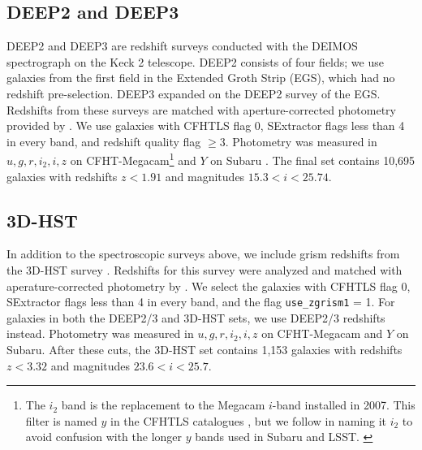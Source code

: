 \subsection{DEEP2 and DEEP3}

DEEP2 and DEEP3 are redshift surveys conducted with the DEIMOS spectrograph on the Keck 2 telescope.
DEEP2 \citep{Newman2013b} consists of four fields; we use galaxies from the first field in the Extended Groth Strip (EGS), which had no redshift pre-selection.
DEEP3 \citep{Cooper2011} expanded on the DEEP2 survey of the EGS.
Redshifts from these surveys are matched with aperture-corrected photometry provided by \citet{Zhou2019a}.
We use galaxies with CFHTLS flag 0, SExtractor flags less than 4 in every band, and redshift quality flag $\geq 3$.
Photometry was measured in $u,g,r,i_2,i,z$ on CFHT-Megacam\footnote{The $i_2$ band is the replacement to the Megacam $i$-band installed in 2007. This filter is named $y$ in the CFHTLS catalogues \citep{Hudelot2012}, but we follow \citet{Zhou2019a} in naming it $i_2$ to avoid confusion with the longer $y$ bands used in Subaru and LSST. \label{ft:i2}} and $Y$ on Subaru \citep{Miyazaki2002}.
The final set contains 10,695 galaxies with redshifts $z < 1.91$ and magnitudes $15.3 < i < 25.74$.


\subsection{3D-HST}

In addition to the spectroscopic surveys above, we include grism redshifts from the 3D-HST survey \citep{Newman2013b,Momcheva2016b}.
Redshifts for this survey were analyzed and matched with aperature-corrected photometry by \citet{Zhou2019a}.
We select the galaxies with CFHTLS flag 0, SExtractor flags less than 4 in every band, and the flag \texttt{use\_zgrism1} = 1.
For galaxies in both the DEEP2/3 and 3D-HST sets, we use DEEP2/3 redshifts instead.
Photometry was measured in $u,g,r,i_2,i,z$ on CFHT-Megacam and $Y$ on Subaru.
After these cuts, the 3D-HST set contains 1,153 galaxies with redshifts $z < 3.32$ and magnitudes $23.6 < i < 25.7$.

